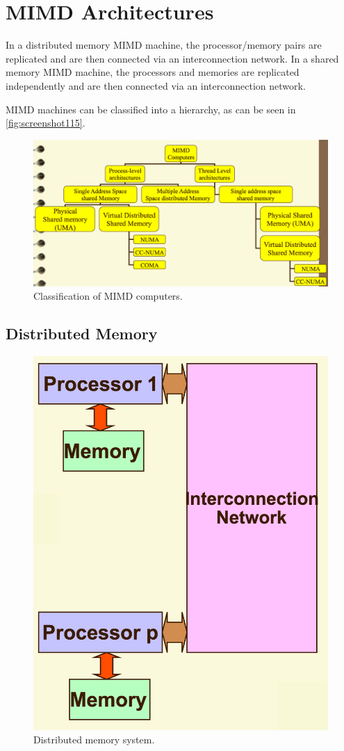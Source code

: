 \chapter{MIMD Architectures}
In a distributed memory MIMD machine, the processor/memory pairs are replicated and are then connected via an interconnection network. In a shared memory MIMD machine, the processors and memories are replicated independently and are then connected via an interconnection network.

MIMD machines can be classified into a hierarchy, as can be seen in \autoref{fig:screenshot115}.

\begin{figure}
\centering
\includegraphics[width=0.7\linewidth]{screenshot115}
\caption{Classification of MIMD computers.}
\label{fig:screenshot115}
\end{figure}

\section{Distributed Memory}
\begin{figure}
\centering
\includegraphics[width=0.7\linewidth]{screenshot110}
\caption{Distributed memory system.}
\label{fig:screenshot110}
\end{figure}


